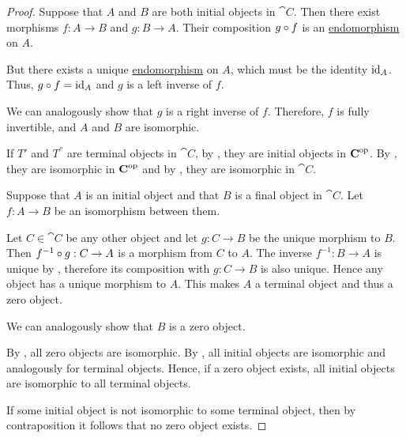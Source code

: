 \begin{proof}
   Suppose that \( A \) and \( B \) are both initial objects in \( \cat{C} \). Then there exist morphisms \( f: A \to B \) and \( g: B \to A \). Their composition \( g \bincirc f \) is an \hyperref[def:morphism_invertibility/endomorphism]{endomorphism} on \( A \).

  But there exists a unique \hyperref[def:morphism_invertibility/endomorphism]{endomorphism} on \( A \), which must be the identity \( \operatorname{id}_A \). Thus, \( g \bincirc f = \id_A \) and \( g \) is a left inverse of \( f \).

  We can analogously show that \( g \) is a right inverse of \( f \). Therefore, \( f \) is fully invertible, and \( A \) and \( B \) are isomorphic.

   If \( T' \) and \( T^\dprime \) are terminal objects in \( \cat{C} \), by , they are initial objects in \( \operatorname{\mathbf{C}}^{\operatorname{op}} \). By , they are isomorphic in \( \operatorname{\mathbf{C}}^{\operatorname{op}} \) and by , they are isomorphic in \( \cat{C} \).

   Suppose that \( A \) is an initial object and that \( B \) is a final object in \( \cat{C} \). Let \( f: A \to B \) be an isomorphism between them.

  Let \( C \in \cat{C} \) be any other object and let \( g: C \to B \) be the unique morphism to \( B \). Then \( f^{-1} \bincirc g: C \to A \) is a morphism from \( C \) to \( A \). The inverse \( f^{-1}: B \to A \) is unique by , therefore its composition with \( g: C \to B \) is also unique. Hence any object has a unique morphism to \( A \). This makes \( A \) a terminal object and thus a zero object.

  We can analogously show that \( B \) is a zero object.

   By , all zero objects are isomorphic. By , all initial objects are isomorphic and analogously for terminal objects. Hence, if a zero object exists, all initial objects are isomorphic to all terminal objects.

  If some initial object is not isomorphic to some terminal object, then by contraposition it follows that no zero object exists.
\end{proof}
